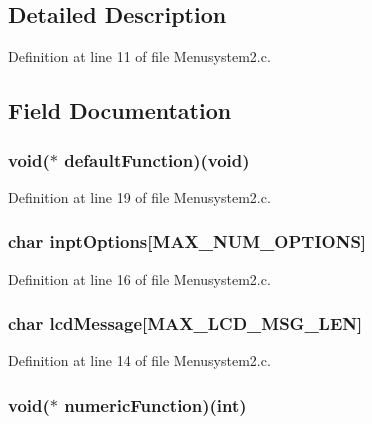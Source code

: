 \subsection{Detailed Description}


Definition at line 11 of file Menusystem2.\+c.



\subsection{Field Documentation}
\hypertarget{struct_sub_menu_ad86a4714605654261200ef4194e1657c}{
\subsubsection[{default\+Function}]{\setlength{\rightskip}{0pt plus 5cm}void($\ast$ default\+Function)(void)}}\label{struct_sub_menu_ad86a4714605654261200ef4194e1657c}


Definition at line 19 of file Menusystem2.\+c.

\hypertarget{struct_sub_menu_aef0980fb751ef312c4ff945539aa3cd4}{
\subsubsection[{inpt\+Options}]{\setlength{\rightskip}{0pt plus 5cm}char inpt\+Options\mbox{[}{\bf M\+A\+X\+\_\+\+N\+U\+M\+\_\+\+O\+P\+T\+I\+O\+N\+S}\mbox{]}}}\label{struct_sub_menu_aef0980fb751ef312c4ff945539aa3cd4}


Definition at line 16 of file Menusystem2.\+c.

\hypertarget{struct_sub_menu_a10ce8be3d2bbadbc9c262b6be4bb3aec}{
\subsubsection[{lcd\+Message}]{\setlength{\rightskip}{0pt plus 5cm}char lcd\+Message\mbox{[}{\bf M\+A\+X\+\_\+\+L\+C\+D\+\_\+\+M\+S\+G\+\_\+\+L\+E\+N}\mbox{]}}}\label{struct_sub_menu_a10ce8be3d2bbadbc9c262b6be4bb3aec}


Definition at line 14 of file Menusystem2.\+c.

\hypertarget{struct_sub_menu_a1dae2f8dad8e2d2a30b13ee69ea542db}{
\subsubsection[{numeric\+Function}]{\setlength{\rightskip}{0pt plus 5cm}void($\ast$ numeric\+Function)(int)}}\label{struct_sub_menu_a1dae2f8dad8e2d2a30b13ee69ea542db}


